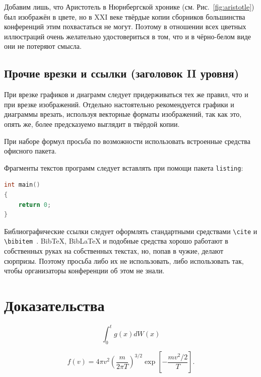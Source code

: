 \documentclass{spisok-article}
\begin{document}
Добавим лишь, что Аристотель в Нюрнбергской хронике
(см. Рис.~\ref{fig:aristotle}) был изображён в цвете, но в XXI веке
твёрдые копии сборников большинства конференций этим похвастаться не
могут. Поэтому в отношении всех цветных иллюстраций очень желательно
удостовериться в том, что и в чёрно-белом виде они не потеряют смысла.

\subsection{Прочие врезки и ссылки (заголовок II уровня)}

При врезке графиков и диаграмм следует придерживаться тех же правил,
что и при врезке изображений. Отдельно настоятельно рекомендуется
графики и диаграммы врезать, используя векторные форматы изображений,
так как это, опять же, более предсказуемо выглядит в твёрдой копии.

При наборе формул просьба по возможности использовать встроенные
средства офисного пакета.

Фрагменты текстов программ следует вставлять при помощи пакета
\texttt{listing}:

\begin{lstlisting}[language=C]
int main()
{
    return 0;
}
\end{lstlisting}

Библиографические ссылки следует оформлять стандартными средствами
\texttt{\textbackslash{}cite} и
\texttt{\textbackslash{}bibitem}~\cite{medvedev2011}. BibTeX, BibLaTeX
и подобные средства хорошо работают в собственных руках на собственных
текстах, но, попав в чужие, делают сюрпризы.  Поэтому просьба либо их
не использовать, либо использовать так, чтобы организаторы конференции
об этом не знали.

\section{Доказательства}

$$\int_0^t g(x)dW(x)$$

\begin{equation}
f(v) = 4 \pi v^2 \left( \frac{m}{2 \pi T} \right)^{3/2} \exp \left[ - \frac{m v^2/2}{T} \right].
\label{eq:maxwell_dist}
\end{equation}
\end{document}
